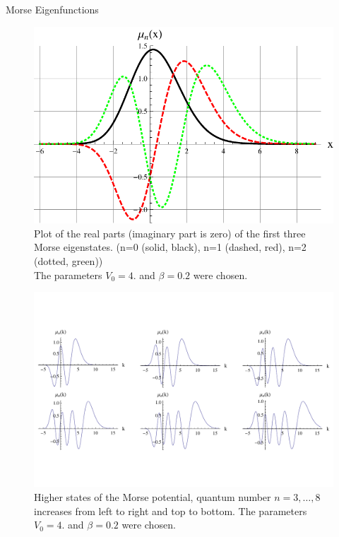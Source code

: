 \begin{chapter}{Morse Eigenfunctions}
\begin{figure}[h!]
	\includegraphics[width=1.0\linewidth]{./figures/MorseWavefunctions/MorseRe0_2.pdf}
       \caption[Morse Wavefunction for $n=0,1,2$]{
	   Plot of the real parts (imaginary part is zero) of the first three Morse eigenstates.
	   (n=0 (solid, black), n=1 (dashed, red), n=2 (dotted, green))\\
	   The parameters $V_0=4.$ and $\beta=0.2$ were chosen.
	\label{fig:MorseRe0_2}
    }

\end{figure}


\begin{figure}[h!]
	\includegraphics[width=1.0\linewidth]{./figures/MorseWavefunctions/MorseRe0_11.pdf}
       \caption[Morse Wavefunction for $n=3,\ldots,8$]{
	   Higher states of the Morse potential, quantum number $n=3,\ldots,8$ increases from left to right and top to bottom.
	   The parameters $V_0=4.$ and $\beta=0.2$ were chosen.
	\label{fig:MorseRe0_11}
    }


\end{figure}
\end{chapter}
